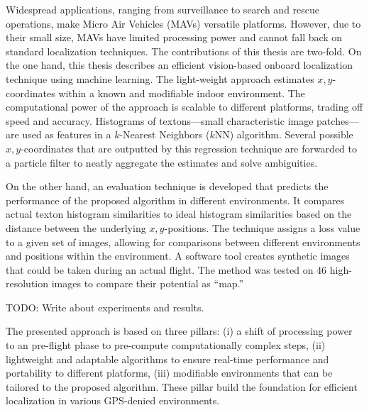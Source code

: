 Widespread applications, ranging from surveillance to search and rescue operations, make Micro Air Vehicles (MAVs) versatile platforms.
However, due to their small size, MAVs have limited processing power and cannot
fall back on standard localization techniques. %
The contributions of this thesis are two-fold. On the one hand, this thesis describes an efficient vision-based onboard localization
technique using machine learning. The light-weight approach estimates $x,y$-coordinates within a known and modifiable indoor environment. The computational power of the approach is scalable to different platforms, trading off speed and accuracy.
Histograms of textons---small characteristic image patches---are used as features in a $k$-Nearest Neighbors ($k$NN) algorithm. Several possible $x,y$-coordinates that are outputted by this regression technique are forwarded to a particle filter to neatly aggregate the estimates and solve ambiguities.

On the other hand, an evaluation technique is developed that predicts the performance of the proposed algorithm in different environments. It compares actual texton histogram similarities to
ideal histogram similarities based on the distance between the underlying
$x,y$-positions. The technique assigns a loss value to a given set of
images, allowing for comparisons between different environments and positions within the environment. A software tool creates synthetic images
that could be taken during an actual flight. The method was tested on 46 high-resolution images to compare their potential as ``map.''


TODO: Write about experiments and results. 

The presented approach is based on three pillars: (i) a shift of processing power to an pre-flight phase to pre-compute
computationally complex steps, (ii) lightweight and adaptable algorithms to ensure real-time performance and portability to different platforms, (iii) modifiable environments that can be tailored to the proposed algorithm. These pillar build the foundation for efficient localization in various GPS-denied environments.